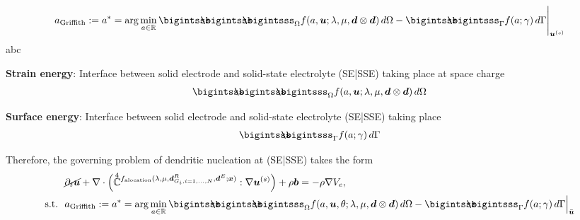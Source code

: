 \documentclass[25pt, a0paper,
portrait,
margin=2mm, 
innermargin=2mm, 
blockverticalspace=7mm, %
colspace=2mm, %
subcolspace=0mm]{tikzposter}
\begin{document}
{\begin{minipage}{0.43\textwidth}
\begin{mdframed}
			\begin{align*}
				a_{\text{Griffith}} := a^{*} = \arg\min_{a\in\mathbb{R}}{\bigintsss\!\!\!\!\!\!\bigintsss\!\!\!\!\!\!\bigintsss_{\Omega} f(a,\bm{u};\lambda,\mu,\bm{d}\otimes\bm{d}) \, d\Omega - \bigintsss\!\!\!\!\!\!\bigintsss_{\Gamma} f(a;\gamma) \, d\Gamma}\Bigg|_{\bm{u}^{(s)}}
			\end{align*}
			abc
		\end{mdframed}
		\begin{minipage}{0.5\textwidth}
			\begin{mdframed}
				\textbf{Strain energy}: 
				Interface between solid electrode and solid-state electrolyte (SE|SSE) 
				taking place at space charge
				\begin{align*}
					\bigintsss\!\!\!\!\!\!\bigintsss\!\!\!\!\!\!\bigintsss_{\Omega}
					f(a,\bm{u};\lambda,\mu,\bm{d}\otimes\bm{d}) \, d\Omega 
				\end{align*}
			\end{mdframed}
		\end{minipage}
		\hfill 
		\begin{minipage}{0.49\textwidth}
			\begin{mdframed}
				\textbf{Surface energy}: 
				Interface between solid electrode and solid-state electrolyte (SE|SSE) 
				taking place 
				\begin{align*} 
					\bigintsss\!\!\!\!\!\!\bigintsss_{\Gamma} f(a;\gamma) \, d\Gamma
				\end{align*}
			\end{mdframed}
		\end{minipage}
		\begin{mdframed}
			Therefore, the governing problem of dendritic nucleation at (SE|SSE) takes the form
			\begin{align*}
				 & 
				\cancel{\partial_{t}\bm{u}}
				+
				\nabla \cdot
				\Big(
				\accentset{\scriptstyle 4}{\mathbb{C}}^{f_{\text{alocation}}(\lambda,\mu,\Bd^{R}_{G_i, i=1,\dots,N},\Bd^{E};\Bx)}
				:\nabla\Bu^{(s)}
				\Big)
				+ \rho\Bb
				= -\rho\nabla V_{e}, \\
				\text{s.t.}\ \
				 & 
				a_{\text{Griffith}} := a^{*}
				= \arg\min_{a\in\mathbb{R}}
				{
					\bigintsss\!\!\!\!\!\!\bigintsss\!\!\!\!\!\!\bigintsss_{\Omega}
					f(a,\bm{u},\theta;\lambda,\mu,\bm{d}\otimes\bm{d}) \, d\Omega
					- 
					\bigintsss\!\!\!\!\!\!\bigintsss_{\Gamma} f(a;\gamma) \, d\Gamma
				}
				\Big|_{\bar{\bm{u}}}
			\end{align*}

\end{mdframed}
\end{minipage}}
\end{document}
